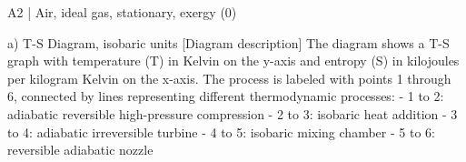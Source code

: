 A2 | Air, ideal gas, stationary, exergy (0)  

a) T-S Diagram, isobaric units  
[Diagram description]  
The diagram shows a T-S graph with temperature (T) in Kelvin on the y-axis and entropy (S) in kilojoules per kilogram Kelvin on the x-axis. The process is labeled with points 1 through 6, connected by lines representing different thermodynamic processes:  
- 1 to 2: adiabatic reversible high-pressure compression  
- 2 to 3: isobaric heat addition  
- 3 to 4: adiabatic irreversible turbine  
- 4 to 5: isobaric mixing chamber  
- 5 to 6: reversible adiabatic nozzle